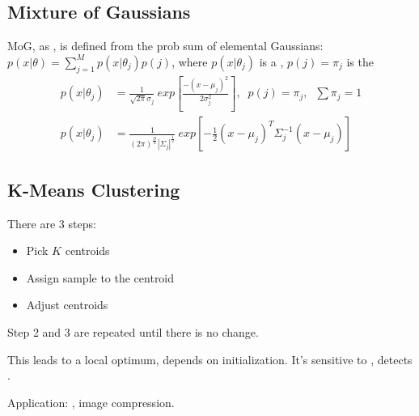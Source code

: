 
\subsection{Mixture of Gaussians}
\ac{MoG}, as , is defined from the \ac{prob} sum of elemental Gaussians: $\displaystyle p(x|\theta) = \sum_{j=1}^{M}p(x|\theta_j)p(j)$, where $p(x|\theta_j)$ is a , $p(j) = \pi_j$ is the 
\begin{align}
	p(x|\theta_j) &= \frac{1}{\sqrt{2\pi}\sigma_j}\:exp\left[\frac{-(x-\mu_j)^2}{2\sigma_j^2}\right],\;\;p(j)=\pi_j, \;\;\sum\pi_j=1 \\
	p(x|\theta_j) &= \frac{1}{(2\pi)^{\frac{D}{2}}|\Sigma_j|^{\frac{1}{2}}}\:exp\left[-\frac{1}{2}(x-\mu_j)^T\Sigma_j^{-1}(x-\mu_j)\right]
\end{align}

\subsection{K-Means Clustering}
There are 3 steps:
\begin{itemize}
	\item Pick $K$ centroids
	\item Assign sample to the centroid
	\item Adjust centroids
\end{itemize}

Step 2 and 3 are repeated until there is no change.

This leads to a local optimum, depends on initialization. It's sensitive to , detects .


Application: \eg, image compression.

